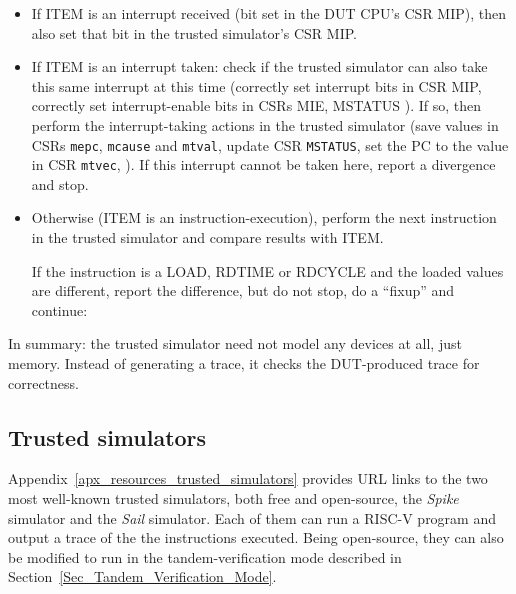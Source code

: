 \begin{itemize}

 \item If ITEM is an interrupt received (bit set in the DUT CPU's CSR
       MIP), then also set that bit in the trusted simulator's CSR MIP.

 \item If ITEM is an interrupt taken: check if the trusted simulator
       can also take this same interrupt at this time (correctly set
       interrupt bits in CSR MIP, correctly set interrupt-enable bits
       in CSRs MIE, MSTATUS {\etc}).  If so, then perform the
       interrupt-taking actions in the trusted simulator (save values
       in CSRs \verb|mepc|, \verb|mcause| and \verb|mtval|, update CSR
       \verb|MSTATUS|, set the PC to the value in CSR \verb|mtvec|,
       {\etc}).  If this interrupt cannot be taken here, report a
       divergence and stop.

 \item Otherwise (ITEM is an instruction-execution), perform the next
       instruction in the trusted simulator and compare results with
       ITEM.

       If the instruction is a LOAD, RDTIME or RDCYCLE and the loaded
       values are different, report the difference, but do not stop,
       do a ``fixup'' and continue:


\end{itemize}

In summary: the trusted simulator need not model any devices at all,
just memory.  Instead of generating a trace, it checks the
DUT-produced trace for correctness.


\subsection{Trusted simulators}

Appendix~\ref{apx_resources_trusted_simulators} provides URL links to
the two most well-known trusted simulators, both free and open-source,
the \emph{Spike} simulator and the \emph{Sail} simulator.  Each of
them can run a RISC-V program and output a trace of the the
instructions executed.  Being open-source, they can also be modified
to run in the tandem-verification mode described in
Section~\ref{Sec_Tandem_Verification_Mode}.

